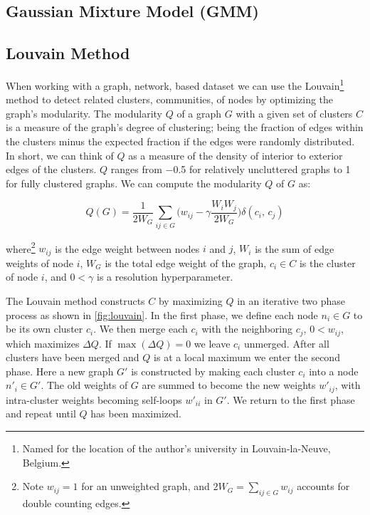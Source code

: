 \subsection{Gaussian Mixture Model (GMM)}
\label{additional:unsupervised:GMM}

\subsection{Louvain Method}
\label{additional:unsupervised:louvain}

When working with a graph, \ie network, based dataset
we can use the Louvain\footnote{Named for the location of the author's university in Louvain-la-Neuve, Belgium.} method \cite{louvain}
to detect related clusters, \ie communities,
of nodes by optimizing the graph's modularity.
The modularity $Q$ of a graph $G$ with a given set of clusters $C$
is a measure of the graph's degree of clustering;
being the fraction of edges within the clusters
minus the expected fraction if the edges were randomly distributed.
In short, we can think of $Q$ as a measure of
the density of interior to exterior edges of the clusters.
$Q$ ranges from \num{-0.5} for relatively uncluttered graphs
to \num{1} for fully clustered graphs.
We can compute the modularity $Q$ of $G$ as:

\begin{equation} \label{eq:unsupervised:louvain:modularity}
Q\left(G\right) = \frac{1}{2 W_{G}} \sum_{ij \in G} \bigg(w_{ij} - \gamma \frac{W_{i} W_{j}}{2 W_{G}}\bigg) \delta\left(c_{i},\,c_{j}\right)
\end{equation}

\noindent where\footnote{Note $w_{ij}=1$ for an unweighted graph, and $2 W_{G} = \sum_{ij \in G} w_{ij}$ accounts for double counting edges.}
$w_{ij}$ is the edge weight between nodes $i$ and $j$,
$W_{i}$ is the sum of edge weights of node $i$,
$W_{G}$ is the total edge weight of the graph,
$c_{i} \in C$ is the cluster of node $i$,
and $0 < \gamma$ is a resolution hyperparameter.

The Louvain method constructs $C$ by maximizing $Q$ in an iterative two phase process as shown in \cref{fig:louvain}.
In the first phase, we define each node $n_{i} \in G$ to be its own cluster $c_{i}$.
We then merge each $c_{i}$ with the neighboring $c_{j}$, $0 < w_{ij}$, which maximizes $\Delta Q$.
If $\max\left(\Delta Q\right) = 0$ we leave $c_{i}$ unmerged.
After all clusters have been merged and $Q$ is at a local maximum we enter the second phase.
Here a new graph $G'$ is constructed by making each cluster $c_{i}$ into a node $n'_{i} \in G'$.
The old weights of $G$ are summed to become the new weights $w'_{ij}$,
with intra-cluster weights becoming self-loops $w'_{ii}$ in $G'$.
We return to the first phase and repeat until $Q$ has been maximized.

